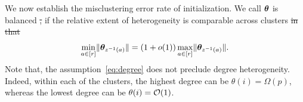 \documentclass[twoside]{article}
\theoremstyle{definition}
\theoremstyle{definition}
\newcommand\Algphase[1]{%
\vspace*{-.7\baselineskip}\Statex\hspace*{\dimexpr-\algorithmicindent-2pt\relax}\rule{\textwidth}{0.4pt}%
\Statex\hspace*{-\algorithmicindent}\textbf{#1}%
\vspace*{-.7\baselineskip}\Statex\hspace*{\dimexpr-\algorithmicindent-2pt\relax}\rule{\textwidth}{0.4pt}%
} %
\providecommand{\DIFdeltex}[1]{{\protect\color{red}\sout{#1}}}                      %
\providecommand{\DIFaddend}{} %
\providecommand{\DIFdelbegin}{} %
\providecommand{\DIFdelend}{} %
\providecommand{\DIFdel}[1]{\texorpdfstring{\DIFdeltex{#1}}{}} %
\newcommand{\DIFscaledelfig}{0.5}
\newlength{\DIFdelgraphicswidth} %
\newlength{\DIFdelgraphicsheight} %
\newcommand{\DIFdelincludegraphics}[2][]{%
\sbox{\DIFdelgraphicsbox}{\DIFOincludegraphics[#1]{#2}}%
\settoboxwidth{\DIFdelgraphicswidth}{\DIFdelgraphicsbox} %
\settoboxtotalheight{\DIFdelgraphicsheight}{\DIFdelgraphicsbox} %
\scalebox{\DIFscaledelfig}{%
\parbox[b]{\DIFdelgraphicswidth}{\usebox{\DIFdelgraphicsbox}\\[-\baselineskip] \rule{\DIFdelgraphicswidth}{0em}}\llap{\resizebox{\DIFdelgraphicswidth}{\DIFdelgraphicsheight}{%
\setlength{\unitlength}{\DIFdelgraphicswidth}%
\begin{picture}(1,1)%
\thicklines\linethickness{2pt} %
{\color[rgb]{1,0,0}\put(0,0){\framebox(1,1){}}}%
{\color[rgb]{1,0,0}\put(0,0){\line( 1,1){1}}}%
{\color[rgb]{1,0,0}\put(0,1){\line(1,-1){1}}}%
\end{picture}%
}\hspace*{3pt}}} %
} %
\DeclareRobustCommand{\DIFaddend}{\DIFOaddend \let\includegraphics\DIFOincludegraphics} %
\DeclareRobustCommand{\DIFdelbegin}{\DIFOdelbegin \let\includegraphics\DIFdelincludegraphics} %
\DeclareRobustCommand{\DIFdelend}{\DIFOaddend \let\includegraphics\DIFOincludegraphics} %
\begin{document}






\DIFaddend We now establish the misclustering error rate of initialization. We call $\boldsymbol{\theta}$ is balanced \DIFdelbegin \DIFdel{, }\DIFdelend if the relative extent of heterogeneity is comparable across clusters
\DIFdelbegin \DIFdel{in that
}\DIFdelend \begin{equation}\label{eq:degree}
{\min_{a\in[r]} \lVert\boldsymbol{\theta}_{z^{-1}(a)}\rVert=\left(1+o(1)\right)\max_{a\in[r]}\lVert\boldsymbol{\theta}_{z^{-1}(a)}\rVert}.
\end{equation}
Note that, the assumption~\eqref{eq:degree} does not preclude degree heterogeneity. Indeed, within each of the clusters, the highest degree can be $\theta(i) = \Omega(p)$, whereas the lowest degree can be $\theta(i)=\mathcal{O}(1)$. 
\end{document}
